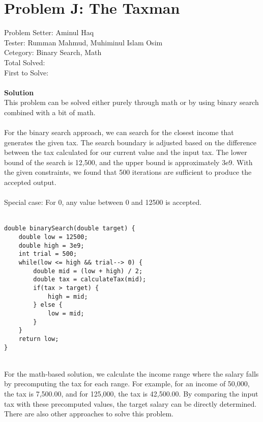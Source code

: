 \section*{Problem J: The Taxman}
Problem Setter: Aminul Haq \\
Tester: Rumman Mahmud,  Muhiminul Islam Osim \\
Cetegory: Binary Search, Math \\
Total Solved:  \\
First to Solve: \\
\\

{\bf{Solution}} \\
This problem can be solved either purely through math or by using binary search combined with a bit of math. \\
\\
For the binary search approach, we can search for the closest income that generates the given tax. The search boundary is adjusted based on the difference between the tax calculated for our current value and the input tax. The lower bound of the search is 12,500, and the upper bound is approximately 3e9. With the given constraints, we found that 500 iterations are sufficient to produce the accepted output.\\
\\
Special case: For 0, any value between 0 and 12500 is accepted.\\
\\

\begin{verbatim}
double binarySearch(double target) {
    double low = 12500;
    double high = 3e9;
    int trial = 500;
    while(low <= high && trial--> 0) {
        double mid = (low + high) / 2;
        double tax = calculateTax(mid);
        if(tax > target) {
            high = mid;
        } else {
            low = mid;
        }
    }
    return low;
}
\end{verbatim}
\\
For the math-based solution, we calculate the income range where the salary falls by precomputing the tax for each range. For example, for an income of 50,000, the tax is 7,500.00, and for 125,000, the tax is 42,500.00. By comparing the input tax with these precomputed values, the target salary can be directly determined.\\

There are also other approaches to solve this problem.\\
